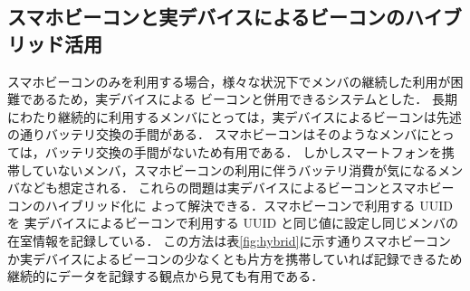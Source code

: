 \subsection{スマホビーコンと実デバイスによるビーコンのハイブリッド活用}
スマホビーコンのみを利用する場合，様々な状況下でメンバの継続した利用が困難であるため，実デバイスによる
ビーコンと併用できるシステムとした．
長期にわたり継続的に利用するメンバにとっては，実デバイスによるビーコンは先述の通りバッテリ交換の手間がある．
スマホビーコンはそのようなメンバにとっては，バッテリ交換の手間がないため有用である．
しかしスマートフォンを携帯していないメンバ，スマホビーコンの利用に伴うバッテリ消費が気になるメンバなども想定される．
これらの問題は実デバイスによるビーコンとスマホビーコンのハイブリッド化に
よって解決できる．スマホビーコンで利用する UUID を
実デバイスによるビーコンで利用する UUID と同じ値に設定し同じメンバの在室情報を記録している．
この方法は表\ref{fig:hybrid}に示す通りスマホビーコンか実デバイスによるビーコンの少なくとも片方を携帯していれば記録できるため
継続的にデータを記録する観点から見ても有用である．


